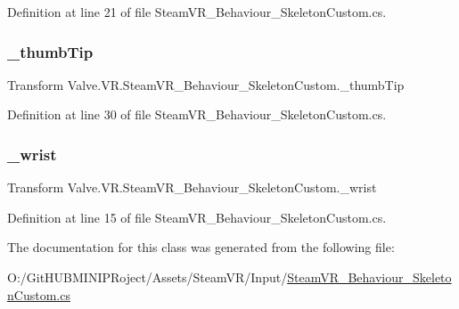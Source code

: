 Definition at line 21 of file Steam\+V\+R\+\_\+\+Behaviour\+\_\+\+Skeleton\+Custom.\+cs.

\mbox{\label{class_valve_1_1_v_r_1_1_steam_v_r___behaviour___skeleton_custom_a25810ac91dd3a8f551ce405cfbb2c835}} 
\subsubsection{\texorpdfstring{\_thumbTip}{\_thumbTip}}
{\footnotesize\ttfamily Transform Valve.\+V\+R.\+Steam\+V\+R\+\_\+\+Behaviour\+\_\+\+Skeleton\+Custom.\+\_\+thumb\+Tip\hspace{0.3cm}{\ttfamily [protected]}}



Definition at line 30 of file Steam\+V\+R\+\_\+\+Behaviour\+\_\+\+Skeleton\+Custom.\+cs.

\mbox{\label{class_valve_1_1_v_r_1_1_steam_v_r___behaviour___skeleton_custom_aa81db1c257e2139e0464a94d85fad179}} 
\subsubsection{\texorpdfstring{\_wrist}{\_wrist}}
{\footnotesize\ttfamily Transform Valve.\+V\+R.\+Steam\+V\+R\+\_\+\+Behaviour\+\_\+\+Skeleton\+Custom.\+\_\+wrist\hspace{0.3cm}{\ttfamily [protected]}}



Definition at line 15 of file Steam\+V\+R\+\_\+\+Behaviour\+\_\+\+Skeleton\+Custom.\+cs.



The documentation for this class was generated from the following file\+:\begin{DoxyCompactItemize}
\item 
O\+:/\+Git\+H\+U\+B\+M\+I\+N\+I\+P\+Roject/\+Assets/\+Steam\+V\+R/\+Input/\mbox{\hyperlink{_steam_v_r___behaviour___skeleton_custom_8cs}{Steam\+V\+R\+\_\+\+Behaviour\+\_\+\+Skeleton\+Custom.\+cs}}\end{DoxyCompactItemize}

